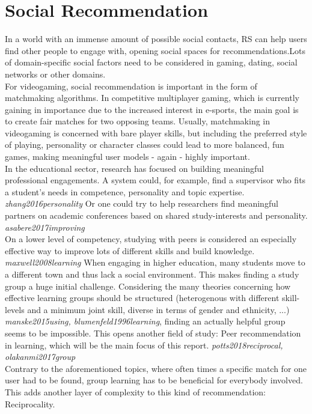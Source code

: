 \documentclass[nochapterpage,bigchapter,linedtoc,longdoc,colorback,accentcolor=tud3b,oneside]{tudreport}
\begin{document}
\section{Social Recommendation}\label{rw:socialrec}
In a world with an immense amount of possible social contacts, RS can help users find other people to engage with, opening social spaces for recommendations.Lots of domain-specific social factors need to be considered in gaming, dating, social networks or other domains.\\ 
For videogaming, social recommendation is important in the form of matchmaking algorithms. In competitive multiplayer gaming, which is currently gaining in importance due to the increased interest in e-sports, the main goal is to create fair matches for two opposing teams. Usually, matchmaking in videogaming is concerned with bare player skills, but including the preferred style of playing, personality or character classes could lead to more balanced, fun games, making meaningful user models - again - highly important.\\
In the educational sector, research has focused on building meaningful professional engagements. A system could, for example, find a supervisor who fits a student's needs in competence, personality and topic expertise. \textit{zhang2016personality} Or one could try to help researchers find meaningful partners on academic conferences based on shared study-interests and personality. \textit{asabere2017improving}\\
On a lower level of competency, studying with peers is considered an especially effective way to improve lots of different skills and build knowledge. \textit{maxwell2008learning} When engaging in higher education, many students move to a different town and thus lack a social environment. This makes finding a study group a huge initial challenge. Considering the many theories concerning how effective learning groups should be structured (heterogenous with different skill-levels and a minimum joint skill, diverse in terms of gender and ethnicity, ...) \textit{manske2015using, blumenfeld1996learning}, finding an actually helpful group seems to be impossible. This opens another field of study: Peer recommendation in learning, which will be the main focus of this report. \textit{potts2018reciprocal, olakanmi2017group}\\
Contrary to the aforementioned topics, where often times a specific match for one user had to be found, group learning has to be beneficial for everybody involved. This adds another layer of complexity to this kind of recommendation: Reciprocality.\\
\end{document}
